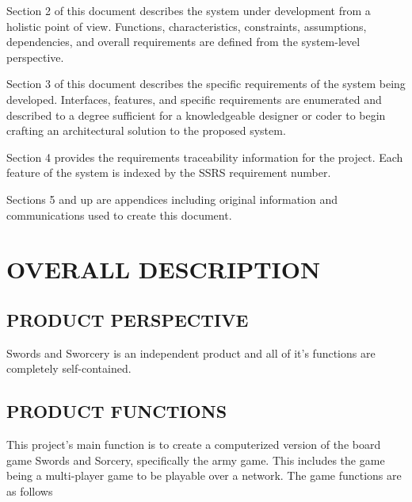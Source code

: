\documentclass[twoside,letterpaper,pdftex]{article}
\begin{document}
\bigskip

{
Section 2 of this document describes the system under development
from a holistic point of view. Functions,
characteristics, constraints, assumptions, dependencies, and overall
requirements are defined from the system-level perspective.}


\bigskip

{
Section 3 of this document describes the specific requirements of
the system being developed. Interfaces, features, and specific
requirements are enumerated and described to a degree sufficient
for a knowledgeable designer or coder to
begin crafting an architectural solution to the proposed system.}


\bigskip

{
Section 4 provides the requirements traceability information for the
project. Each feature of the system is indexed by
the SSRS requirement number.}


\bigskip

{
Sections 5 and up are appendices including original information and
communications used to create this document.}

\clearpage\section[OVERALL DESCRIPTION]{\rmfamily\bfseries OVERALL DESCRIPTION}
\hypertarget{RefHeading17059017292}{}{
{\textit{ }}}

\subsection[PRODUCT PERSPECTIVE]{\rmfamily\bfseries PRODUCT PERSPECTIVE}
\hypertarget{RefHeading17259017292}{}{
\foreignlanguage{english}{\textit{ }}}

{\color{black}
Swords and Sworcery is an independent product and all of it's functions are completely 
self-contained.}

\subsection[PRODUCT FUNCTIONS]{\rmfamily\bfseries PRODUCT FUNCTIONS}
\hypertarget{RefHeading17459017292}{}{\itshape
}

This project's main function is to create a computerized version of the board
game Swords and Sorcery, specifically the army game. This includes the game 
being a multi-player game to be playable over a network. The game functions
are as follows
\end{document}
